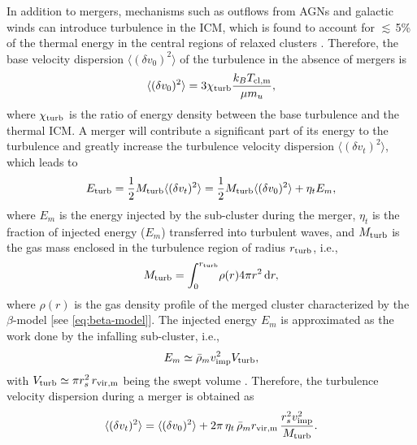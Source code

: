 In addition to mergers, mechanisms such as outflows from AGNs and galactic
winds can introduce turbulence in the ICM, which is found to account for
$\lesssim\,$5\% of the thermal energy in the central regions
of relaxed clusters \cite{vazza2011}.
Therefore, the base velocity dispersion $\langle (\delta v_0)^2 \rangle$
of the turbulence in the absence of mergers is
\begin{equation}
  \label{eq:v-turb-base}
  \langle (\delta v_0)^2 \rangle
    = 3 \chi_{\mathrm{turb}} \frac{k_B T_{\mathrm{cl,m}}}{\mu m_u} ,
\end{equation}
where
$\chi_{\mathrm{turb}}$ is the ratio of energy density between the base
turbulence and the thermal ICM.
A merger will contribute a significant part of its energy to the turbulence
and greatly increase the turbulence velocity dispersion
$\langle (\delta v_t)^2 \rangle$, which leads to
\begin{equation}
  \label{eq:energy-turb}
  E_{\mathrm{turb}} =
    \frac{1}{2} M_{\mathrm{turb}} \langle (\delta v_t)^2 \rangle =
    \frac{1}{2} M_{\mathrm{turb}} \langle (\delta v_0)^2 \rangle + \eta_t E_m ,
\end{equation}
where
$E_m$ is the energy injected by the sub-cluster during the merger,
$\eta_t$ is the fraction of injected energy ($E_m$) transferred into
turbulent waves,
and $M_{\mathrm{turb}}$ is the gas mass enclosed in the turbulence region
of radius $r_{\mathrm{turb}}$, i.e.,
\begin{equation}
  \label{eq:mass-turb}
  M_{\mathrm{turb}} = \int_0^{r_{\mathrm{turb}}} \! \rho(r) 4\pi r^2 \,\mathrm{d}r,
\end{equation}
where $\rho(r)$ is the gas density profile of the merged cluster
characterized by the $\beta$-model [see \autoref{eq:beta-model}].
The injected energy $E_m$ is approximated as the work done by the infalling
sub-cluster, i.e.,
\begin{equation}
  \label{eq:energy-inj}
  E_m \simeq \bar{\rho}_m v_{\mathrm{imp}}^2 V_{\mathrm{turb}},
\end{equation}
with $V_{\mathrm{turb}} \simeq \pi r_s^2 \,r_{\mathrm{vir,m}}$ being the swept volume
\cite{fujita2003,cassano2005}.
Therefore, the turbulence velocity dispersion during a merger is obtained as
\begin{equation}
  \label{eq:v-turb}
  \langle (\delta v_t)^2 \rangle
    = \langle (\delta v_0)^2 \rangle
    + 2 \pi\,\eta_t\, \bar{\rho}_m r_{\mathrm{vir,m}}
      \,\frac{r_s^2 v_{\mathrm{imp}}^2}{M_{\mathrm{turb}}} .
\end{equation}

